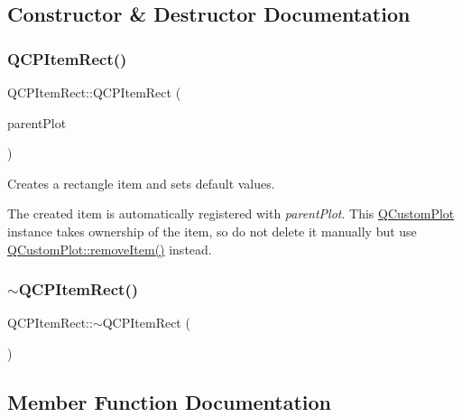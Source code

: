 \subsection{Constructor \& Destructor Documentation}
\mbox{\label{class_q_c_p_item_rect_a412ad1579f7a1fba453d0fa28c496cbc}} 
\subsubsection{\texorpdfstring{QCPItemRect()}{QCPItemRect()}}
{\footnotesize\ttfamily Q\+C\+P\+Item\+Rect\+::\+Q\+C\+P\+Item\+Rect (\begin{DoxyParamCaption}\item[{\mbox{\hyperlink{class_q_custom_plot}{Q\+Custom\+Plot}} $\ast$}]{parent\+Plot }\end{DoxyParamCaption})\hspace{0.3cm}{\ttfamily [explicit]}}

Creates a rectangle item and sets default values.

The created item is automatically registered with {\itshape parent\+Plot}. This \mbox{\hyperlink{class_q_custom_plot}{Q\+Custom\+Plot}} instance takes ownership of the item, so do not delete it manually but use \mbox{\hyperlink{class_q_custom_plot_ae04446557292551e8fb6e2c106e1848d}{Q\+Custom\+Plot\+::remove\+Item()}} instead. \mbox{\label{class_q_c_p_item_rect_af9e89f80457afc2d0fd2c6527b40a5f2}} 
\subsubsection{\texorpdfstring{$\sim$QCPItemRect()}{~QCPItemRect()}}
{\footnotesize\ttfamily Q\+C\+P\+Item\+Rect\+::$\sim$\+Q\+C\+P\+Item\+Rect (\begin{DoxyParamCaption}{ }\end{DoxyParamCaption})\hspace{0.3cm}{\ttfamily [virtual]}}



\subsection{Member Function Documentation}
\mbox{\label{class_q_c_p_item_rect_a844027325b33a3b7eef424128ee5109c}} 

